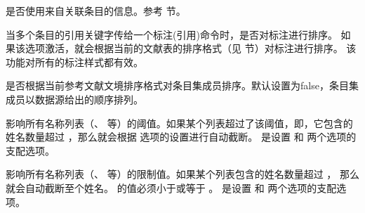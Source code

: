\begin{optionlist}


是否使用来自关联条目的信息。参考  节。



当多个条目的引用关键字传给一个标注(引用)命令时，是否对标注进行排序。
如果该选项激活，就会根据当前的文献表的排序格式（见  节）对标注进行排序。
该功能对所有的标注样式都有效。


是否根据当前参考文献文境排序格式对条目集成员排序。默认设置为false，条目集成员以数据源给出的顺序排列。



影响所有名称列表（、 等）的阈值。如果某个列表超过了该阈值，即，它包含的姓名数量超过 ，那么就会根据  选项的设置进行自动截断。 是设置  和  两个选项的支配选项。


影响所有名称列表（、 等）的限制值。如果某个列表包含的姓名数量超过 ，
那么就会自动截断至个姓名。 的值必须小于或等于 。
 是设置  和  两个选项的支配选项。


\end{optionlist}
